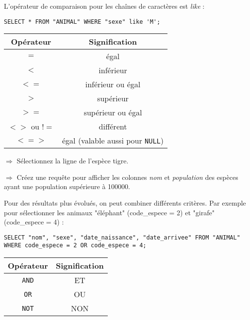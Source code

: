 \documentclass[11pt]{article}
\begin{document}
				L'opérateur de comparaison pour les chaînes de caractères est \textit{like} :\\
				\begin{lstlisting}
SELECT * FROM "ANIMAL" WHERE "sexe" like 'M';
				\end{lstlisting}
				
				\begin{center}
					\begin{tabular}{c|c}
						\textbf{Opérateur} & \textbf{Signification} \\
						\hline
						$=$ & égal \\
						$<$ & inférieur \\
						$<=$ & inférieur ou égal \\
						$>$ & supérieur \\
						$>=$ & supérieur ou égal \\
						$<>$ ou $!=$ & différent \\
						$<=>$ & égal (valable aussi pour \lstinline{NULL}) \\
					\end{tabular}
				\end{center}
				
				$\Rightarrow$ Sélectionnez la ligne de l'espèce tigre.
				
				$\Rightarrow$ Créez une requête pour afficher les colonnes \textit{nom} et \textit{population} des espèces ayant une population supérieure à 100000.
				
				
				Pour des résultats plus évolués, on peut combiner différents critères. Par exemple pour sélectionner les animaux "éléphant" (code\_espece = 2) et "girafe" (code\_espece = 4) :
				\begin{lstlisting}
SELECT "nom", "sexe", "date_naissance", "date_arrivee" FROM "ANIMAL" WHERE code_espece = 2 OR code_espece = 4;
				\end{lstlisting}
				
				\begin{center}
					\begin{tabular}{c|c}
						\textbf{Opérateur} & \textbf{Signification} \\
						\hline
						\lstinline{AND} & ET \\
						\lstinline{OR} & OU \\
						\lstinline{NOT} & NON \\
					\end{tabular}
				\end{center}
				
\end{document}
